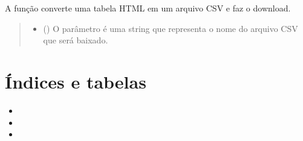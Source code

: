 \documentclass[letterpaper,10pt,brazil]{sphinxmanual}
\begin{document}
\begin{fulllineitems}
\label{\detokenize{index:htmlToCsv}}
\pysigstartsignatures
{}
\pysigstopsignatures
\sphinxAtStartPar
A função  converte uma tabela HTML em um arquivo CSV e faz o download.
\begin{quote}\begin{description}
\begin{itemize}
\item {} 
\sphinxAtStartPar
{} () \textendash{} O parâmetro  é uma string que representa o nome do arquivo CSV que será baixado.

\end{itemize}

\end{description}\end{quote}

\end{fulllineitems}



\chapter{Índices e tabelas}
\label{\detokenize{index:indices-e-tabelas}}\begin{itemize}
\item {} 
\sphinxAtStartPar
{}

\item {} 
\sphinxAtStartPar
{}

\item {} 
\sphinxAtStartPar
{}

\end{itemize}



\renewcommand{\indexname}{Índice}
\printindex
\end{document}
